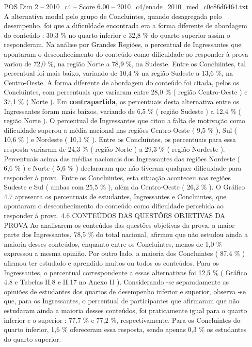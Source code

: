 \begin{textsample}{POS Dim 2 – 2010\_c4 – Score 6.00 – 2010\_c4/enade\_2010\_med\_c0c86d6464.txt}
A alternativa modal pelo grupo de Concluintes, quando desagregada pelo desempenho, foi que a dificuldade encontrada era a forma diferente de abordagem do conteúdo : 30,3 \% no quarto inferior e 32,8 \% do quarto superior assim o responderam.
Na análise por Grandes Regiões, o percentual de Ingressantes que apontaram o desconhecimento do conteúdo como dificuldade ao responder à prova variou de 72,0 \%, na região Norte a 78,9 \%, na Sudeste.
Entre os Concluintes, tal percentual foi mais baixo, variando de 10,4 \% na região Sudeste a 13,6 \%, na Centro-Oeste.
A forma diferente de abordagem do conteúdo foi citada, pelos os Concluintes, com percentuais que variaram entre 28,0 \% ( região Centro-Oeste ) e 37,1 \% ( Norte ).
Em \textbf{contrapartida}, os percentuais desta alternativa entre os Ingressantes foram mais baixos, variando de 6,5 \% ( região Sudeste ) a 12,4 \% ( região Norte ).
O percentual de Ingressantes que citou a falta de motivação como dificuldade superou a média nacional nas regiões Centro-Oeste ( 9,5 \% ), Sul ( 10,6 \% ) e Nordeste ( 10,1 \% ).
Entre os Concluintes, os percentuais para essa resposta variaram de 24,3 \% ( região Norte ) a 29,3 \% ( região Nordeste ).
Percentuais acima das médias nacionais dos Ingressantes das regiões Nordeste ( 6,6 \% ) e Norte ( 5,6 \% ) declararam que não tiveram qualquer dificuldade para responder à prova.
Entre os Concluintes, esta situação aconteceu nas regiões Sudeste e Sul ( ambas com 25,5 \% ), além da Centro-Oeste ( 26,2 \% ).
O Gráfico 4.7 apresenta os percentuais de estudantes, Ingressantes e Concluintes, que apontaram o desconhecimento do conteúdo como dificuldade percebida ao responder à prova. 4.6 CONTEÚDOS DAS QUESTÕES OBJETIVAS DA PROVA Ao analisarem os conteúdos das questões objetivas da prova, a maior parte dos Ingressantes, 78,5 \% do total nacional, afirmou que não estudou ainda a maioria desses conteúdos, enquanto entre os Concluintes, menos de 1,0 \% expressou a mesma opinião.
Por outro lado, a maioria dos Concluintes ( 87,4 \% ) afirmou ter estudado e aprendido muitos ou todos os conteúdos.
Para os Ingressantes, o percentual correspondente a essas alternativas foi 12,5 \% ( Gráfico 4.8 e Tabelas II.8 e II.17 no Anexo II ).
Considerando -se separadamente as opiniões de estudantes dos quartos de desempenho inferior e superior, observa -se que, para os Ingressantes, o percentual de participantes que afirmaram que não estudaram ainda a maioria desses conteúdos, foi praticamente igual para o quarto inferior e o superior : 77,7 \% e 77,2 \%, respectivamente.
Para os Concluintes do quarto inferior, 1,6 \% ofereceram essa resposta, sendo apenas 0,3 \% os estudantes do quarto superior.

\end{textsample}
